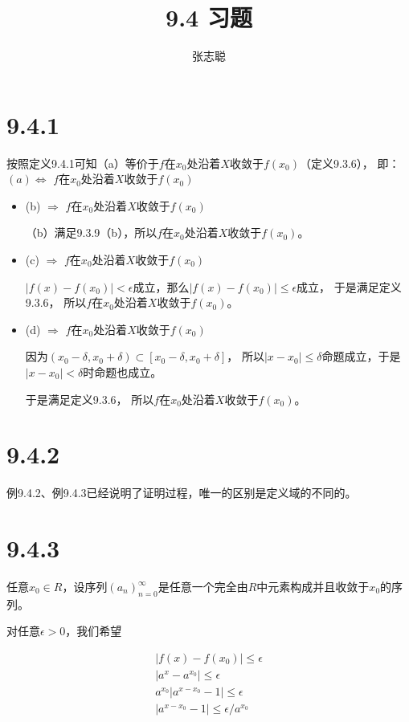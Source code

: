\documentclass{article}
\begin{document}
\title{9.4 习题}
\author{张志聪}
\maketitle

\section*{9.4.1}
按照定义9.4.1可知（a）等价于$f$在$x_0$处沿着$X$收敛于$f(x_0)$（定义9.3.6），
即：$(a) \Leftrightarrow$ $f$在$x_0$处沿着$X$收敛于$f(x_0)$

\begin{itemize}
  \item (b) $\Rightarrow$ $f$在$x_0$处沿着$X$收敛于$f(x_0)$

        （b）满足9.3.9（b），所以$f$在$x_0$处沿着$X$收敛于$f(x_0)$。
  \item (c) $\Rightarrow$ $f$在$x_0$处沿着$X$收敛于$f(x_0)$

        $|f(x) - f(x_0)| < \epsilon$成立，那么$|f(x) - f(x_0)| \leq \epsilon$成立，
        于是满足定义9.3.6，
        所以$f$在$x_0$处沿着$X$收敛于$f(x_0)$。
  \item (d) $\Rightarrow$ $f$在$x_0$处沿着$X$收敛于$f(x_0)$

        因为$(x_0 - \delta, x_0 + \delta) \subset [x_0 - \delta, x_0 + \delta]$，
        所以$|x - x_0| \leq \delta$命题成立，于是$|x - x_0| < \delta$时命题也成立。

        于是满足定义9.3.6，
        所以$f$在$x_0$处沿着$X$收敛于$f(x_0)$。
\end{itemize}

\section*{9.4.2}

例9.4.2、例9.4.3已经说明了证明过程，唯一的区别是定义域的不同的。

\section*{9.4.3}

任意$x_0 \in R$，设序列$(a_n)_{n=0}^\infty$是任意一个完全由$R$中元素构成并且收敛于$x_0$的序列。

对任意$\epsilon > 0$，我们希望

\begin{align*}
  |f(x) - f(x_0)| \leq \epsilon           \\
  |a^x - a^{x_0}| \leq \epsilon           \\
  a^{x_0} |a^{x-x_0} - 1| \leq \epsilon   \\
  |a^{x-x_0} - 1| \leq \epsilon / a^{x_0} \\
\end{align*}
\end{document}
